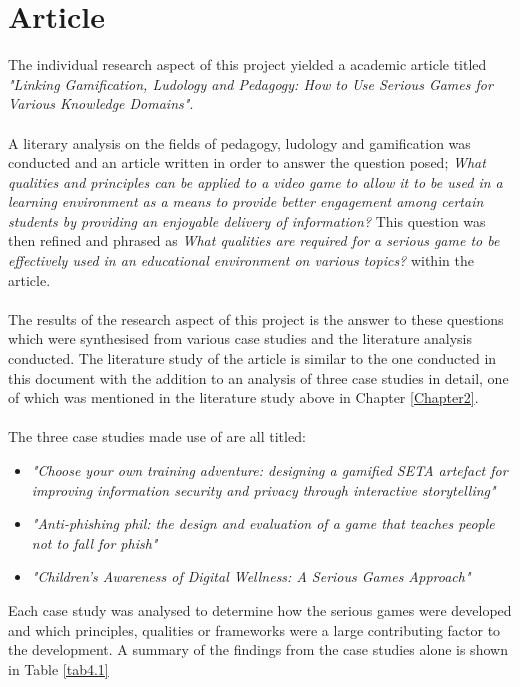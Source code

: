 \section{Article}
The individual research aspect of this project yielded a academic article titled \textit{"Linking Gamification, Ludology and Pedagogy: How to Use Serious Games for Various Knowledge Domains"}.
\\\\
A literary analysis on the fields of pedagogy, ludology and gamification was conducted and an article written in order to answer the question posed; \textit{What qualities and principles can be applied to a video game to allow it to be used in a learning environment as a means to provide better engagement among certain students by providing an enjoyable delivery of information?} This question was then refined and phrased as \textit{What qualities are required for a serious game to be effectively used in an educational environment on various topics?} within the article.
\\\\
The results of the research aspect of this project is the answer to these questions which were synthesised from various case studies and the literature analysis conducted. The literature study of the article is similar to the one conducted in this document with the addition to an analysis of three case studies in detail, one of which was mentioned in the literature study above in Chapter \ref{Chapter2}.
\\\\
The three case studies made use of are all titled:
\begin{itemize}
\item \textit{"Choose your own training adventure: designing a gamified SETA artefact for improving information security and privacy through interactive storytelling"}
\item \textit{"Anti-phishing phil: the design and evaluation of a game that teaches people not to fall for phish"}
\item \textit{"Children’s Awareness of Digital Wellness: A Serious Games Approach"}
\end{itemize}

\noindent Each case study was analysed to determine how the serious games were developed and which principles, qualities or frameworks were a large contributing factor to the development. A summary of the findings from the case studies alone is shown in Table \ref{tab4.1}

